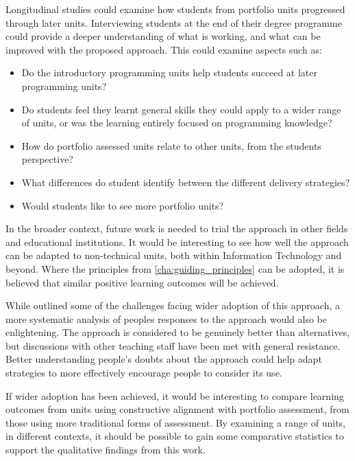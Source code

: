 
Longitudinal studies could examine how students from portfolio units progressed through later units. Interviewing students at the end of their degree programme could provide a deeper understanding of what is working, and what can be improved with the proposed approach. This could examine aspects such as:
\begin{itemize}[noitemsep,nolistsep]
	\item Do the introductory programming units help students succeed at later programming units?
	\item Do students feel they learnt general skills they could apply to a wider range of units, or was the learning entirely focused on programming knowledge? 
	\item How do portfolio assessed units relate to other units, from the students perspective?
	\item What differences do student identify between the different delivery strategies?
	\item Would students like to see more portfolio units?
\end{itemize}

In the broader context, future work is needed to trial the approach in other fields and educational institutions. It would be interesting to see how well the approach can be adapted to non-technical units, both within Information Technology and beyond. Where the principles from \cref{cha:guiding_principles} can be adopted, it is believed that similar positive learning outcomes will be achieved.

While  outlined some of the challenges facing wider adoption of this approach, a more systematic analysis of peoples responses to the approach would also be enlightening. The approach is considered to be genuinely better than alternatives, but discussions with other teaching staff have been met with general resistance. Better understanding people's doubts about the approach could help adapt strategies to more effectively encourage people to consider its use.

If wider adoption has been achieved, it would be interesting to compare learning outcomes from units using constructive alignment with portfolio assessment, from those using more traditional forms of assessment. By examining a range of units, in different contexts, it should be possible to gain some comparative statistics to support the qualitative findings from this work.



